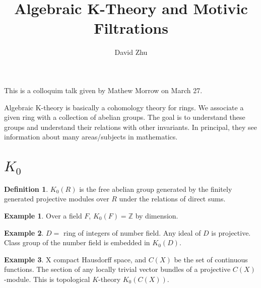 \documentclass{article}
\title{Algebraic K-Theory and Motivic Filtrations}
\author{David Zhu}
\theoremstyle{definition}
\theoremstyle{definition}
\newtheorem{definition}{Definition}[section]
\theoremstyle{definition}
\theoremstyle{definition}
\theoremstyle{definition}
\theoremstyle{definition}
\theoremstyle{definition}
\newtheorem{example}{Example}[section]
\begin{document}
\maketitle

This is a colloquim talk given by Mathew Morrow on March 27. 

Algebraic K-theory is basically a cohomology theory for rings. We associate a given ring with a collection of abelian groups. The goal is to understand these groups and understand their relations with other invariants. In principal, they see information about many areas/subjects in mathematics. 

\section{$K_0$}


\begin{tcolorbox}[colback=purple!5!white,colframe=purple!75!black]
\begin{definition}
$K_0(R)$ is the free abelian group generated by the finitely generated projective modules over $R$ under the relations of direct sums.
\end{definition}
\end{tcolorbox}


\begin{tcolorbox}[colback=yellow!5!white,colframe=yellow!30!white]
\begin{example}
Over a field $F$, $K_0(F)=\mathbb{Z}$ by dimension. 
\end{example}
\end{tcolorbox}


\begin{tcolorbox}[colback=yellow!5!white,colframe=yellow!30!white]
\begin{example}
$D=$ ring of integers of number field. Any ideal of $D$ is projective. Class group of the number field is embedded in $K_0(D)$.
\end{example}
\end{tcolorbox}

\begin{tcolorbox}[colback=yellow!5!white,colframe=yellow!30!white]
\begin{example}
X compact Hausdorff space, and $C(X)$ be the set of continuous functions. The section of any locally trivial vector bundles of a projective $C(X)$-module. This is topological $K$-theory $K_0(C(X))$.
\end{example}
\end{tcolorbox}
\end{document}

